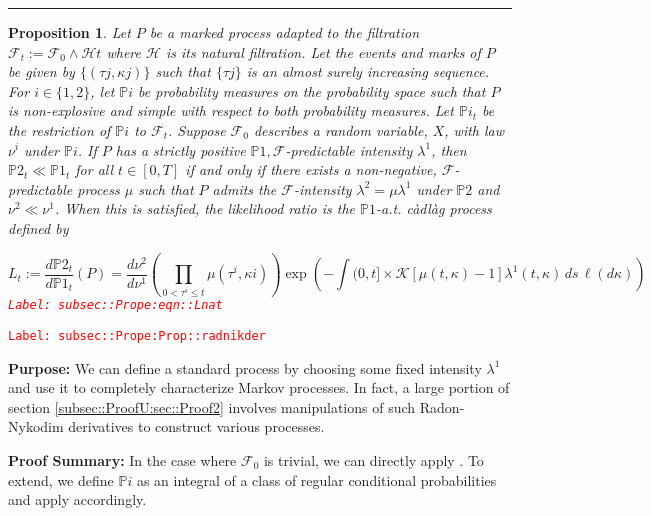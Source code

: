 \documentclass[12pt]{article}
\newcommand{\mb}{\mathbb}
\newcommand{\mc}{\mathcal}
\newcommand{\tr}{\textcolor{red}}
\newcommand{\labe}[1]{\tr{\texttt{Label: #1}}}
\newcommand{\purpose}{\textbf{Purpose: }}
\newcommand{\pfsum}{\textbf{Proof Summary: }}
\newcommand{\lin}{\rule{\linewidth}{0.4 pt}}
\newcommand{\pr}{\mb{P}}							%
\renewcommand{\t}{t}							%
\newcommand{\F}{\mc{F}}							%
\newcommand{\FH}{\mc{H}}						%
\newcommand{\ts}[1]{_{#1}}						%
\newcommand{\rate}{\lambda}						%
\newcommand{\m}{\mu}							%
\newcommand{\mm}{\nu}							%
\newcommand{\rt}{\tau}							%
\renewcommand{\mark}{\kappa}					%
\newcommand{\rp}{P}								%
\newcommand{\mspce}{\mc{K}}						%
\newtheorem{prop}[thms]{Proposition}
\begin{document}
\lin

\begin{prop}
Let \(\rp\) be a marked process adapted to the filtration \(\F\ts{\t} := \F\ts{0}\wedge \FH{\t}\) where \(\FH\) is its natural filtration. Let the events and marks of \(\rp\) be given by \(\{(\rt{j},\mark{j})\}\) such that \(\{\rt{j}\}\) is an almost surely increasing sequence. For \(i \in \{1,2\}\), let \(\pr{i}\) be probability measures on the probability space such that \(\rp\) is non-explosive and simple with respect to both probability measures. Let \(\pr{i}_\t\) be the restriction of \(\pr{i}\) to \(\F\ts{\t}\). Suppose \(\F\ts{0}\) describes a random variable, \(X\), with law \(\mm^i\) under \(\pr{i}\). If \(\rp\) has a strictly positive \(\pr{1},\F\)-predictable intensity \(\rate^1\), then \(\pr{2}_\t \ll \pr{1}_\t\) for all \(\t \in [0,T]\) if and only if there exists a non-negative, \(\F\)-predictable process \(\m\) such that \(\rp\) admits the \(\F\)-intensity \(\rate^2 = \m\rate^1\) under \(\pr{2}\) and \(\mm^2 \ll \mm^1\). When this is satisfied, the likelihood ratio is the \(\pr{1}\)-a.t. c\`adl\`ag process defined by 

\begin{equation}
L_\t:= \frac{d\pr{2}_\t}{d\pr{1}_\t}(\rp) = \frac{d\mm^2}{d\mm^1}\left(\prod_{0<\rt^i\leq \t} \m(\rt^i,\mark{i})\right)\exp\left(-\int{(0,\t]\times \mspce}[\m(\t,\mark) - 1]\rate^1(\t,\mark)\,ds\,\ell(d\mark)\right)
\label{subsec::Prope:eqn::Lnat}
\end{equation}
\labe{subsec::Prope:eqn::Lnat}
\label{subsec::Prope:Prop::radnikder}
\end{prop}
\labe{subsec::Prope:Prop::radnikder}

\purpose We can define a standard process by choosing some fixed intensity \(\rate^1\) and use it to completely characterize Markov processes. In fact, a large portion of section \ref{subsec::ProofU:sec::Proof2} involves manipulations of such Radon-Nykodim derivatives to construct various processes.

\pfsum In the case where \(\F\ts{0}\) is trivial, we can directly apply \cite[Theorem 14.4.I]{DalVer08}. To extend, we define \(\pr{i}\) as an integral of a class of regular conditional probabilities and apply \cite[Theorem 14.4.I]{DalVer08} accordingly.
\end{document}
